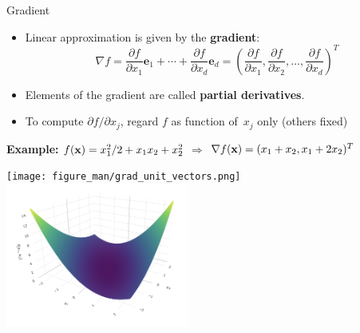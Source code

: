 \documentclass[11pt,compress,t,notes=noshow, xcolor=table]{beamer}
\begin{document}
\begin{vbframe}{Gradient}

\begin{itemize}
    \item Linear approximation is given by the \textbf{gradient}:
        \begin{equation*}
            \nabla f = \frac{\partial f}{\partial x_1} \bm e_1 + \cdots + \frac{\partial f}{\partial x_d} \bm e_d =
            \left(\frac{\partial f}{\partial x_1}, \frac{\partial f}{\partial x_2}, \ldots, \frac{\partial f}{\partial x_d}\right)^T
        \end{equation*}
    \item Elements of the gradient are called \textbf{partial derivatives}.
    \item To compute $\partial f/\partial x_j$, regard $f$ as function of~$x_j$ only (others fixed)
\end{itemize}

\vspace{0.5\baselineskip}

\textbf{Example:} $f(\mathbf{x}) = x_1^2/2 + x_1 x_2 + x_2^2$ $\Rightarrow$ $\nabla f(\mathbf{x}) = (x_1 + x_2, x_1 + 2x_2)^T$

\vspace{-0.5\baselineskip}

\begin{center}
	\texttt{[image: figure\_man/grad\_unit\_vectors.png]} ~~~ \includegraphics[width=0.45\textwidth]{figure_man/gradient2.png}
\end{center}

\end{vbframe}
\end{document}
